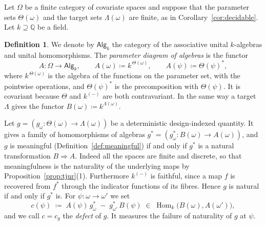 \documentclass[11pt,a4paper]{article}
\theoremstyle{plain}
\theoremstyle{definition}
\newtheorem{definition}[theorem]{Definition}
\theoremstyle{remark}
\newcommand{\cat}[1]{\mathsf{#1}}
\newcommand{\catO}{\cat{\Omega}}
\newcommand{\Alg}{\cat{Alg}}
\DeclareMathOperator{\Hom}{Hom}
\begin{document}
Let $\catO$ be a finite category of covariate spaces and suppose that the
parameter sets $\Theta(\omega)$ and the target sets $\Lambda(\omega)$ are
finite, as in Corollary~\ref{cor:decidable}. Let $k \supseteq \mathbb{Q}$ be a
field.

\begin{definition}\label{def:diagalg}
We denote by $\Alg_k$ the category of the associative unital $k$-algebras and
unital homomorphisms. The \emph{parameter diagram of algebras} is the functor
\[
A \colon \catO \longrightarrow \Alg_k,
\qquad
A(\omega) \coloneqq k^{\,\Theta(\omega)},
\qquad
A(\psi) \coloneqq \Theta(\psi)^{*},
\]
where $k^{\,\Theta(\omega)}$ is the algebra of the functions on the parameter
set, with the pointwise operations, and $\Theta(\psi)^{*}$ is the
precomposition with $\Theta(\psi)$. It is covariant because $\Theta$ and
$k^{(-)}$ are both contravariant. In the same way a target $\Lambda$ gives the
functor $B(\omega) \coloneqq k^{\Lambda(\omega)}$.
\end{definition}

Let $g = (g_\omega \colon \Theta(\omega) \to \Lambda(\omega))$ be a
deterministic design-indexed quantity. It gives a family of homomorphisms of
algebras $g^{*} = (g_\omega^{*} \colon B(\omega) \to A(\omega))$, and $g$ is
meaningful (Definition~\ref{def:meaningful}) if and only if $g^{*}$ is a
natural transformation $B \Rightarrow A$. Indeed all the spaces are finite and
discrete, so that meaningfulness is the naturality of the underlying maps by
Proposition~\ref{prop:tjur}(1). Furthermore $k^{(-)}$ is faithful, since a map
$f$ is recovered from $f^{*}$ through the indicator functions of its fibres.
Hence $g$ is natural if and only if $g^{*}$ is. For
$\psi \colon \omega \to \omega'$ we set
\begin{equation}\label{eq:defect}
c(\psi) \;\coloneqq\; A(\psi)\, g_{\omega}^{*} \;-\; g_{\omega'}^{*}\, B(\psi)
\;\in\; \Hom_k\bigl(B(\omega), A(\omega')\bigr),
\end{equation}
and we call $c = c_g$ the \emph{defect} of $g$. It measures the failure of
naturality of $g$ at $\psi$.
\end{document}
